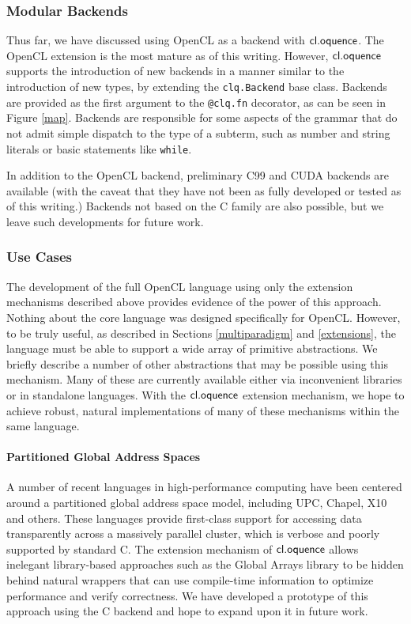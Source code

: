 \documentclass{llncs}
\begin{document}
\subsubsection{Modular Backends}\label{backends}
Thus far, we have discussed using OpenCL as a backend with $\textsf{cl.oquence}$. The OpenCL extension is the most mature as of this writing. However, $\textsf{cl.oquence}$ supports the introduction of new backends in a manner similar to the introduction of new types, by extending the \verb|clq.Backend| base class. Backends are provided as the first argument to the \verb|@clq.fn| decorator, as can be seen in Figure \ref{map}. 
Backends are responsible for some aspects of the grammar that do not admit simple dispatch to the type of a subterm, such as number and string literals or basic statements like \verb|while|.

In addition to the OpenCL backend, preliminary C99 and CUDA backends are available (with the caveat that they have not been as fully developed or tested as of this writing.) Backends not based on the C family are also possible, but we leave such developments for future work.


\subsubsection{Use Cases}
The development of the full OpenCL language using only the extension mechanisms described above provides evidence of the power of this approach. Nothing about the core language was designed specifically for OpenCL. However, to be truly useful, as described in Sections \ref{multiparadigm} and  \ref{extensions}, the language must be able to support a wide array of primitive abstractions. We briefly describe a number of other abstractions that may be possible using this mechanism. Many of these are currently available either via inconvenient libraries or in standalone languages. With the $\textsf{cl.oquence}$ extension mechanism, we hope to achieve robust, natural implementations of many of these mechanisms within the same language.

\paragraph{Partitioned Global Address Spaces}
A number of recent languages in high-performance computing have been centered around a partitioned global address space model, including UPC, Chapel, X10 and others. These languages provide first-class support for accessing data transparently across a massively parallel cluster, which is verbose and poorly supported by standard C. The extension mechanism of $\textsf{cl.oquence}$ allows inelegant library-based approaches such as the Global Arrays library to be hidden behind natural wrappers that can use compile-time information to optimize performance and verify correctness. We have developed a prototype of this approach using the C backend and hope to expand upon it in future work.
\end{document}

